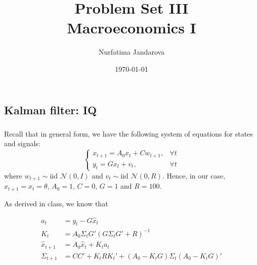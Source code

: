 \documentclass[]{article}
\title{Problem Set III \\ \large Macroeconomics I}
\author{Nurfatima Jandarova}
\date{\today}
\begin{document}
\maketitle

\subsection{Kalman filter: IQ}

\subsubsection{}
Recall that in general form, we have the following system of equations for states and signals:
\begin{equation}
\begin{cases}
x_{t+1} = A_0x_t + Cw_{t+1}, &\forall t \\
y_t = Gx_{t} + v_t, &\forall t
\end{cases}\nonumber
\end{equation}
where $w_{t+1}\sim\text{iid }\mathcal{N}(0, I)$ and $v_{t}\sim\text{iid }\mathcal{N}(0, R)$. Hence, in our case,$x_{t+1} = x_{t} = \theta$, $A_0 = 1$, $C = 0$, $G = 1$ and $R = 100$.

As derived in class, we know that

\begin{align}
a_t& = y_t - G\hat{x}_t \label{KF1}\\
K_t& = A_0\Sigma_tG'(G\Sigma_tG' + R)^{-1}\label{KF2} \\
\hat{x}_{t+1}& = A_0\hat{x}_t + K_ta_t \label{KF3}	\\
\Sigma_{t+1}& = CC' + K_tRK_t' + (A_0 - K_tG)\Sigma_t(A_0 - K_tG)' \label{KF4}
\end{align}
\end{document}
